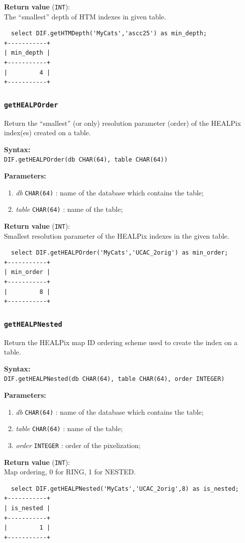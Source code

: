 \documentclass[10pt,titlepage]{article}
\newcommand{\syntax}[1]
{
  \bigskip
  \noindent
  \textbf{Syntax:} \\ 
  \indent \texttt{#1}
}
\newenvironment{parameters}
{
  \medskip
  \noindent
  \textbf{Parameters:}
  \begin{enumerate}
}
{
  \end{enumerate}
}
\newcommand{\param}[2]
{
  \item \textit{#1} \texttt{#2} 
}
\newcommand{\return}[1]
{
  \medskip
  \noindent
  \textbf{Return value} (\texttt{#1}): \\
  \indent
}
\newcommand{\example}
{
\medskip
\noindent{\textbf{Example:}}
}
\begin{document}
\return{INT} The ``smallest'' depth of HTM indexes in given table.

\example
%
\begin{verbatim}
  select DIF.getHTMDepth('MyCats','ascc25') as min_depth;
+-----------+
| min_depth |
+-----------+
|         4 |
+-----------+
\end{verbatim}
%
%


\subsubsection{{\tt getHEALPOrder}}
Return the ``smallest'' (or only) resolution parameter (order) of the HEALPix
index(es) created on a table.

\syntax{DIF.getHEALPOrder(db CHAR(64), table CHAR(64))}

\begin{parameters}
  \param{db}{CHAR(64)}: name of the database which contains the table;
  \param{table}{CHAR(64)}: name of the table;
\end{parameters}

\return{INT} Smallest resolution parameter of the HEALPix indexes in the
 given table.

\example
%
\begin{verbatim}
  select DIF.getHEALPOrder('MyCats','UCAC_2orig') as min_order;
+-----------+
| min_order |
+-----------+
|         8 |
+-----------+
\end{verbatim}
%
%


\subsubsection{{\tt getHEALPNested}}
Return the HEALPix map ID ordering scheme used to create the index on a table.

\syntax{DIF.getHEALPNested(db CHAR(64), table CHAR(64), order INTEGER)}

\begin{parameters}
  \param{db}{CHAR(64)}: name of the database which contains the table;
  \param{table}{CHAR(64)}: name of the table;
  \param{order}{INTEGER}: order of the pixelization;
\end{parameters}

\return{INT} Map ordering, 0 for RING, 1 for NESTED.

%
\begin{verbatim}
  select DIF.getHEALPNested('MyCats','UCAC_2orig',8) as is_nested;
+-----------+
| is_nested |
+-----------+
|         1 |
+-----------+
\end{verbatim}
%
%
\end{document}
